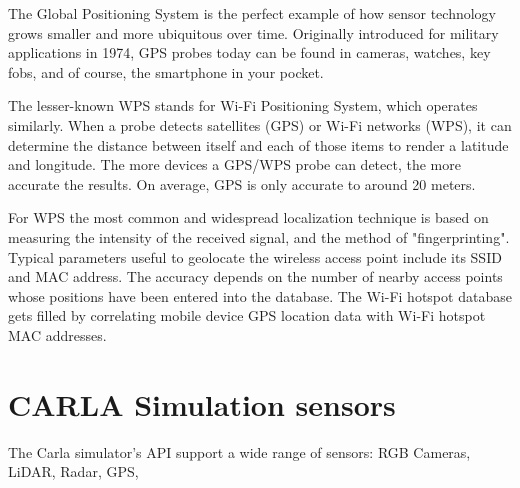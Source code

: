 The Global Positioning System is the perfect example of how sensor
technology grows smaller and more ubiquitous over time. Originally introduced
for military applications in 1974, GPS probes today can be found in cameras,
watches, key fobs, and of course, the smartphone in your pocket.

The lesser-known WPS stands for Wi-Fi Positioning System, which operates
similarly. When a probe detects satellites (GPS) or Wi-Fi networks (WPS), it can
determine the distance between itself and each of those items to render a
latitude and longitude. The more devices a GPS/WPS probe can detect, the more
accurate the results. On average, GPS is only accurate to around 20 meters.

For WPS the most common and widespread localization technique is based on
measuring the intensity of the received signal, and the method of
"fingerprinting". Typical parameters useful to geolocate the wireless access
point include its SSID and MAC address. The accuracy depends on the number of
nearby access points whose positions have been entered into the database. The
Wi-Fi hotspot database gets filled by correlating mobile device GPS location
data with Wi-Fi hotspot MAC addresses.

\section{CARLA Simulation sensors}

The Carla simulator's API support a wide range of sensors: RGB Cameras, LiDAR,
Radar, GPS, 
